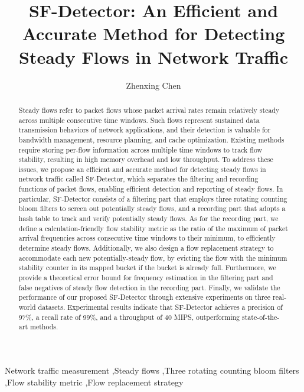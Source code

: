 \documentclass[preprint,12pt]{elsarticle}
\begin{document}
\begin{frontmatter}

\title{SF-Detector: An Efficient and Accurate Method for Detecting Steady Flows in Network Traffic}

\author[csust]{Zhenxing Chen}


\begin{abstract}
Steady flows refer to packet flows whose packet arrival rates remain relatively steady across multiple consecutive time windows. Such flows represent sustained data transmission behaviors of network applications, and their detection is valuable for bandwidth management, resource planning, and cache optimization. Existing methods require storing per-flow information across multiple time windows to track flow stability, resulting in high memory overhead and low throughput. To address these issues, we propose an efficient and accurate method for detecting steady flows in network traffic called SF-Detector, which separates the filtering and recording functions of packet flows, enabling efficient detection and reporting of steady flows. In particular, SF-Detector consists of a filtering part that employs three rotating counting bloom filters to screen out potentially steady flows, and a recording part that adopts a hash table to track and verify potentially steady flows. As for the recording part, we define a calculation-friendly flow stability metric as the ratio of the maximum of packet arrival frequencies across consecutive time windows to their minimum, to efficiently determine steady flows. Additionally, we also design a flow replacement strategy to accommodate each new potentially-steady flow, by evicting the flow with the minimum stability counter in its mapped bucket if the bucket is already full. Furthermore, we provide a theoretical error bound for frequency estimation in the filtering part and false negatives of steady flow detection in the recording part. Finally, we validate the performance of our proposed SF-Detector through extensive experiments on three real-world datasets. Experimental results indicate that SF-Detector achieves a precision of 97\%, a recall rate of 99\%, and a throughput of 40 MIPS, outperforming state-of-the-art methods.
\end{abstract}

\begin{keyword}
Network traffic measurement \sep Steady flows \sep Three rotating counting bloom filters \sep Flow stability metric \sep Flow replacement strategy
\end{keyword}

\end{frontmatter}
\end{document}
